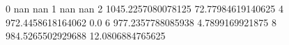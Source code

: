0 nan nan
1 nan nan
2 1045.2257080078125 72.77984619140625
4 972.4458618164062 0.0
6 977.2357788085938 4.7899169921875
8 984.5265502929688 12.0806884765625
